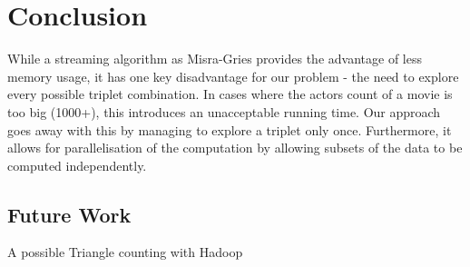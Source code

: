 \label{Conclusion}
\section{Conclusion}

While a streaming algorithm as Misra-Gries provides the advantage of less memory usage, it has one key disadvantage for our problem - the need to explore every possible triplet combination. In cases where the actors count of a movie is too big (1000+), this introduces an unacceptable running time. Our approach goes away with this by managing to explore a triplet only once. Furthermore, it allows for parallelisation of the computation by allowing subsets of the data to be computed independently.


\subsection{Future Work}
A possible Triangle counting with Hadoop